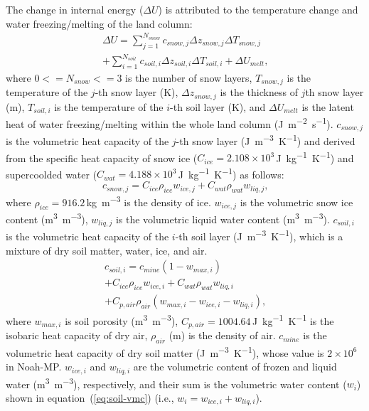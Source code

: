 \documentclass[essd]{copernicus}
\begin{document}
The change in internal energy ($\Delta U$) is attributed to the temperature change and water freezing/melting of the land column:
\begin{multline}
    \Delta U = \sum_{j=1}^{N_{snow}} c_{snow,j} \Delta z_{snow,j} \Delta T_{snow,j} \\
    + \sum_{i=1}^{N_{soil}} c_{soil,i} \Delta z_{soil,i} \Delta T_{soil,i}
    + \Delta U_{melt} \text{,}
\end{multline}
where $0<=N_{snow}<=3$ is the number of snow layers, $T_{snow,j}$ is the temperature of the $j$-th snow layer (\unit{K}), $\Delta z_{snow,j}$ is the thickness of $j$th snow layer (\unit{m}), $T_{soil,i}$ is the temperature of the $i$-th soil layer (\unit{K}), and $\Delta U_{melt}$ is the latent heat of water freezing/melting within the whole land column (\unit{J~m^{-2}~s^{-1}}).  $c_{snow,j}$ is the volumetric heat capacity of the $j$-th snow layer (\unit{J~m^{-3}~K^{-1}}) and derived from the specific heat capacity of snow ice ($C_{ice} = 2.108 \times 10^3$\,\unit{J~kg^{-1}~K^{-1}}) and supercoolded water ($C_{wat} = 4.188 \times 10^3$\,\unit{J~kg^{-1}~K^{-1}}) as follows:
\begin{equation}
    c_{snow,j} = C_{ice} \rho_{ice} w_{ice,j} + C_{wat} \rho_{wat} w_{liq,j} \text{,}
\end{equation}
where $\rho_{ice} = 916.2$\,\unit{kg~m^{-3}} is the density of ice. $w_{ice,j}$ is the volumetric snow ice content (\unit{m^3~m^{-3}}), $w_{liq,j}$ is the volumetric liquid water content (\unit{m^3~m^{-3}}). $c_{soil,i}$ is the volumetric heat capacity of the $i$-th soil layer (\unit{J~m^{-3}~K^{-1}}), which is a mixture of dry soil matter, water, ice, and air.
\begin{multline}
    c_{soil,i} = c_{mine} (1 - w_{max,i}) \\
    + C_{ice} \rho_{ice} w_{ice,i} + C_{wat} \rho_{wat} w_{liq,i} \\
    + C_{p,air} \rho_{air} (w_{max,i} - w_{ice,i} - w_{liq,i}) \text{,}
\end{multline}
where $w_{max,i}$ is soil porosity (\unit{m^3~m^{-3}}), $C_{p,air} = 1004.64$\,\unit{J~kg^{-1}~K^{-1}} is the isobaric heat capacity of dry air, $\rho_{air}$ (\unit{m}) is the density of air. $c_{mine}$ is the volumetric heat capacity of dry soil matter (\unit{J~m^{-3}~K^{-1}}), whose value is $2\times10^6$ in Noah-MP. $w_{ice,i}$ and $w_{liq,i}$ are the volumetric content of frozen and liquid water (\unit{m^3~m^{-3}}), respectively, and their sum is the volumetric water content ($w_{i}$) shown in equation~(\ref{eq:soil-vmc}) (i.e., $w_{i} = w_{ice,i} + w_{liq,i}$).
\end{document}
